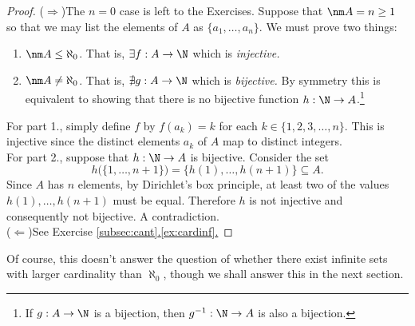 \begin{proof}
($\Longrightarrow$)\quad The $n=0$ case is left to the Exercises. Suppose that $\nm A=n\ge 1$ so that we may list the elements of $A$ as $\{a_1,\ldots,a_n\}$. We must prove two things:
\begin{enumerate}
  \item $\nm A\le\aleph_0$. That is, $\exists f:A\to\N$ which is \emph{injective.}
  \item $\nm A\neq\aleph_0$. That is, $\nexists g:A\to\N$ which is \emph{bijective.} By symmetry this is equivalent to showing that there is no bijective function $h:\N\to A$.\footnote{If $g:A\to\N$ is a bijection, then $g^{-1}:\N\to A$ is also a bijection.}
\end{enumerate}
For part 1., simply define $f$ by $f(a_k)=k$ for each $k\in\{1,2,3,\ldots,n\}$. This is injective since the distinct elements $a_k$ of $A$ map to distinct integers.\\
For part 2., suppose that $h:\N\to A$ is bijective. Consider the set
\[h\bigl(\{1,\ldots,n+1\}\bigr)=\bigl\{h(1),\ldots,h(n+1)\bigr\}\subseteq A.\]
Since $A$ has $n$ elements, by Dirichlet's box principle, at least two of the values $h(1),\ldots,h(n+1)$ must be equal. Therefore $h$ is not injective and consequently not bijective. A contradiction.\\[3pt]
($\Longleftarrow$)\quad See Exercise \hyperref[ex:cardinf]{\ref*{subsec:cant}.\ref*{ex:cardinf}.}
\end{proof}

\noindent Of course, this doesn't answer the question of whether there exist infinite sets with larger cardinality than $\aleph_0$, though we shall answer this in the next section.


